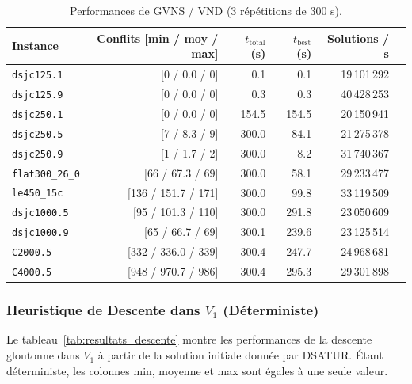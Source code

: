 \documentclass{article}
\begin{document}
\begin{table}[H]
\centering
\small
\setlength{\tabcolsep}{5pt}
\begin{tabular}{lrrrrr}
\toprule
\textbf{Instance} & \textbf{Conflits [min / moy / max]} & \textbf{$t_{\text{total}}$ (s)} & \textbf{$t_{\text{best}}$ (s)} & \textbf{Solutions / s} \\
\midrule
\texttt{dsjc125.1}      & [0 / 0.0 / 0]       & 0.1   & 0.1   & 19\,101\,292 \\
\texttt{dsjc125.9}      & [0 / 0.0 / 0]       & 0.3   & 0.3   & 40\,428\,253 \\
\texttt{dsjc250.1}      & [0 / 0.0 / 0]       & 154.5 & 154.5 & 20\,150\,941 \\
\texttt{dsjc250.5}      & [7 / 8.3 / 9]       & 300.0 & 84.1  & 21\,275\,378 \\
\texttt{dsjc250.9}      & [1 / 1.7 / 2]       & 300.0 & 8.2   & 31\,740\,367 \\
\texttt{flat300\_26\_0} & [66 / 67.3 / 69]   & 300.0 & 58.1  & 29\,233\,477 \\
\texttt{le450\_15c}     & [136 / 151.7 / 171] & 300.0 & 99.8  & 33\,119\,509 \\
\texttt{dsjc1000.5}     & [95 / 101.3 / 110]  & 300.0 & 291.8 & 23\,050\,609 \\
\texttt{dsjc1000.9}     & [65 / 66.7 / 69]   & 300.1 & 239.6 & 23\,125\,514 \\
\texttt{C2000.5}        & [332 / 336.0 / 339] & 300.4 & 247.7 & 24\,968\,681 \\
\texttt{C4000.5}        & [948 / 970.7 / 986] & 300.4 & 295.3 & 29\,301\,898 \\
\bottomrule
\end{tabular}
\caption{Performances de GVNS / VND (3 répétitions de 300 s).}
\label{tab:resultats_vns}
\end{table}

\subsubsection{Heuristique de Descente dans $V_1$ (Déterministe)}
Le tableau~\ref{tab:resultats_descente} montre les performances de la descente gloutonne dans $V_1$ à partir de la solution initiale donnée par DSATUR. Étant déterministe, les colonnes min, moyenne et max sont égales à une seule valeur.
\end{document}
